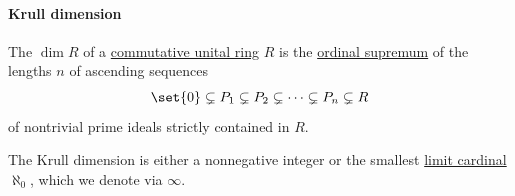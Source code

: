 \paragraph{Krull dimension}

\begin{definition}\label{def:krull_dimension}
  The  \( \dim R \) of a \hyperref[def:ring/commutative]{commutative unital ring} \( R \) is the \hyperref[def:ordinal_ordering]{ordinal supremum} of the lengths \( n \) of ascending sequences
  \begin{equation*}
    \set{ 0 } \subsetneq P_1 \subsetneq P_2 \subsetneq \cdots \subsetneq P_n \subsetneq R
  \end{equation*}
  of nontrivial prime ideals strictly contained in \( R \).

  The Krull dimension is either a nonnegative integer or the smallest \hyperref[def:successor_and_limit_cardinal]{limit cardinal} \( \aleph_0 \), which we denote via \( \infty \).
\end{definition}

